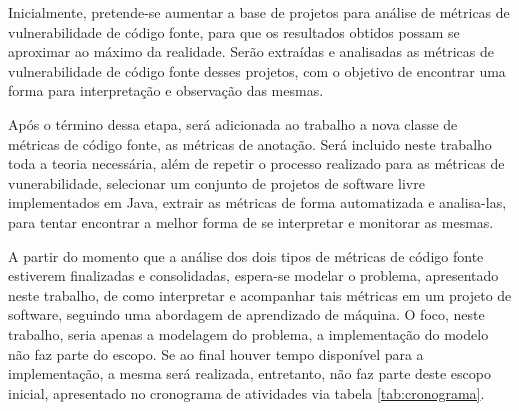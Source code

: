 Inicialmente, pretende-se aumentar a base de projetos para análise de métricas
de vulnerabilidade de código fonte, para que os resultados obtidos possam
se aproximar ao máximo da realidade. Serão extraídas e analisadas as métricas de
vulnerabilidade de código fonte desses projetos, com o objetivo de encontrar uma
forma para interpretação e observação das mesmas.

Após o término dessa etapa, será adicionada ao trabalho a nova classe de
métricas de código fonte, as métricas de anotação. Será incluido neste
trabalho toda a teoria necessária, além de repetir o processo realizado para as
métricas de vunerabilidade, selecionar um conjunto de projetos de software livre
implementados em Java, extrair as métricas de forma automatizada e analisa-las,
para tentar encontrar a melhor forma de se interpretar e monitorar as mesmas.

A partir do momento que a análise dos dois tipos de métricas de código fonte
estiverem finalizadas e consolidadas, espera-se modelar o problema, apresentado
neste trabalho, de como interpretar e acompanhar tais métricas em um projeto de
software, seguindo uma abordagem de aprendizado de máquina. O foco, neste
trabalho, seria apenas a modelagem do problema, a implementação do modelo não
faz parte do escopo. Se ao final houver tempo disponível para a implementação, a
mesma será realizada, entretanto, não faz parte deste escopo inicial,
apresentado no cronograma de atividades via tabela \ref{tab:cronograma}.

